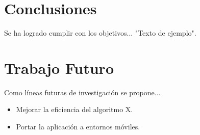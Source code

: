 \section{Conclusiones}
Se ha logrado cumplir con los objetivos... "Texto de ejemplo".

\section{Trabajo Futuro}
Como líneas futuras de investigación se propone...
\begin{itemize}
    \item Mejorar la eficiencia del algoritmo X.
    \item Portar la aplicación a entornos móviles.
\end{itemize}